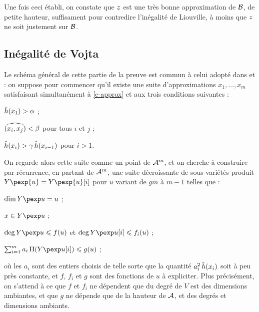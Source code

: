 \documentclass[a4paper, 11pt]{article}
\renewcommand*\bsc{}
\begin{document}
Une fois ceci établi, on constate que $z$ est une très bonne
approximation de $\mathcal B$, de petite hauteur, suffisament pour contredire
l'inégalité de \bsc{Liouville}, à moins que $z$ ne soit justement sur
$\mathcal B$.

\subsection{Inégalité de Vojta}

Le schéma général de cette partie de la preuve est commun à celui adopté dans
\cite{remivds} et \cite{falda} : on suppose pour commencer qu'il existe une
suite d'approximations $x_1, \ldots, x_m$ satisfaisant simultanément à
\eqref{e-approx} et aux trois conditions suivantes :
\begin{enumthm}
  \item $\mathop{\smash{\hat h}}(x_1) > \alpha$ ;
  \item $\widehat{(x_i,x_j)} < \beta$ pour tous $i$ et $j$ ;
  \item $\mathop{\smash{\hat h}}(x_i) > \gamma \mathop{\smash{\hat h}}(x_{i-1})$ pour $i > 1$.
\end{enumthm}
On regarde alors cette suite comme un point de $\mathcal A^m$, et on cherche à
construire par récurrence, en partant de $\mathcal A^m$,  une suite
décroissante de sous-variétés produit $Y\pexp{u} = Y\pexp{u}[i]$ pour $u$
variant de $gm$ à $m-1$ telles que :
\begin{enumthm}
  \item $\dim Y\pexp u = u$ ;
  \item $x \in Y\pexp u$ ;
  \item $\deg Y\pexp u \le f(u)$ et $\deg Y\pexp u[i] \le f_i(u)$ ;
  \item $\sum_{i=1}^m a_i \haut{Y\pexp u[i]} \le g(u)$ ;
\end{enumthm}
où les $a_i$ sont des entiers choisis de telle sorte que la quantité $a_i^2
\mathop{\smash{\hat h}}(x_i)$ soit à peu près constante, et $f$, $f_i$ et $g$ sont des
fonctions de $u$ à expliciter. Plus précisément, on s'attend à ce que $f$ et
$f_i$ ne dépendent que du degré de $V$ est des dimensions ambiantes, et que
$g$ ne dépende que de la hauteur de $\mathcal A$, et des degrés et dimensions
ambiants.

\printbibliography
\end{document}
